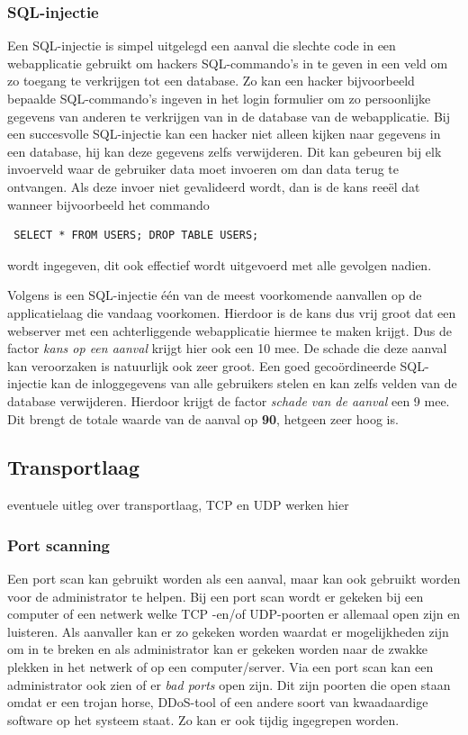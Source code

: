 \documentclass[pdftex,a4paper,12pt]{report}
\begin{document}
\subsubsection{SQL-injectie}
Een SQL-injectie is simpel uitgelegd een aanval die slechte code in een webapplicatie gebruikt om hackers SQL-commando's in te geven in een veld om zo toegang te verkrijgen tot een database. Zo kan een hacker bijvoorbeeld bepaalde SQL-commando's ingeven in het login formulier om zo persoonlijke gegevens van anderen te verkrijgen van in de database van de webapplicatie. Bij een succesvolle SQL-injectie kan een hacker niet alleen kijken naar gegevens in een database, hij kan deze gegevens zelfs verwijderen. Dit kan gebeuren bij elk invoerveld waar de gebruiker data moet invoeren om dan data terug te ontvangen. Als deze invoer niet gevalideerd wordt, dan is de kans reeël dat wanneer bijvoorbeeld het commando \begin{verbatim} SELECT * FROM USERS; DROP TABLE USERS;\end{verbatim} wordt ingegeven, dit ook effectief wordt uitgevoerd met alle gevolgen nadien. \citep{Acunetix2014} \newline

Volgens \cite{Acunetix2014} is een SQL-injectie één van de meest voorkomende aanvallen op de applicatielaag die vandaag voorkomen. Hierdoor is de kans dus vrij groot dat een webserver met een achterliggende webapplicatie hiermee te maken krijgt. Dus de factor \textit{kans op een aanval} krijgt hier ook een 10 mee. De schade die deze aanval kan veroorzaken is natuurlijk ook zeer groot. Een goed gecoördineerde SQL-injectie kan de inloggegevens van alle gebruikers stelen en kan zelfs velden van de database verwijderen. Hierdoor krijgt de factor \textit{schade van de aanval} een 9 mee. Dit brengt de totale waarde van de aanval op \textbf{90}, hetgeen zeer hoog is.

\subsection{Transportlaag}
eventuele uitleg over transportlaag, TCP en UDP werken hier
\subsubsection{Port scanning}
Een port scan kan gebruikt worden als een aanval, maar kan ook gebruikt worden voor de administrator te helpen. Bij een port scan wordt er gekeken bij een computer of een netwerk welke TCP -en/of UDP-poorten er allemaal open zijn en luisteren. Als aanvaller kan er zo gekeken worden waardat er mogelijkheden zijn om in te breken en als administrator kan er gekeken worden naar de zwakke plekken in het netwerk of op een computer/server. Via een port scan kan een administrator ook zien of er \textit{bad ports} open zijn. Dit zijn poorten die open staan omdat er een trojan horse, DDoS-tool of een andere soort van kwaadaardige software op het systeem staat. Zo kan er ook tijdig ingegrepen worden. \citep{Kessler2001} \newline
\end{document}

